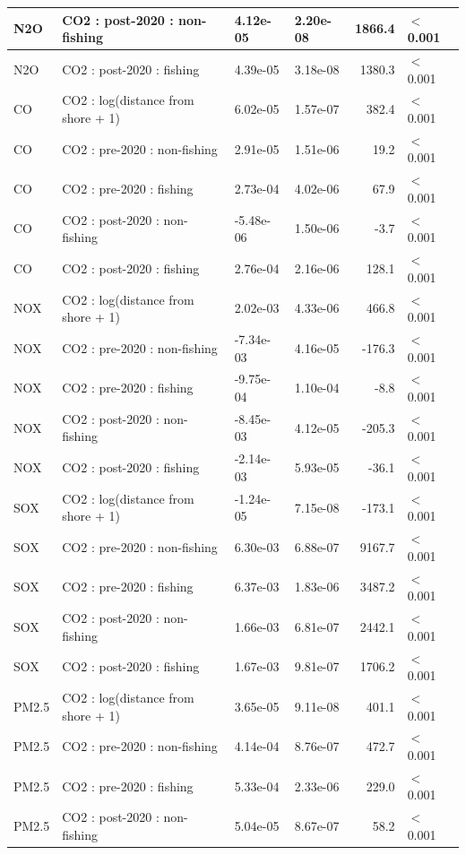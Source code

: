 \documentclass[lineno,pdflatex,sn-nature]{sn-jnl}
\begin{document}
\begin{table}[!h]
\begin{tabular}[t]{l|l|l|l|r|l}
\hline
N2O & CO2 : post-2020 : non-fishing & 4.12e-05 & 2.20e-08 & 1866.4 & $<$0.001\\
\hline
N2O & CO2 : post-2020 : fishing & 4.39e-05 & 3.18e-08 & 1380.3 & $<$0.001\\
\hline
CO & CO2 : log(distance from shore + 1) & 6.02e-05 & 1.57e-07 & 382.4 & $<$0.001\\
\hline
CO & CO2 : pre-2020 : non-fishing & 2.91e-05 & 1.51e-06 & 19.2 & $<$0.001\\
\hline
CO & CO2 : pre-2020 : fishing & 2.73e-04 & 4.02e-06 & 67.9 & $<$0.001\\
\hline
CO & CO2 : post-2020 : non-fishing & -5.48e-06 & 1.50e-06 & -3.7 & $<$0.001\\
\hline
CO & CO2 : post-2020 : fishing & 2.76e-04 & 2.16e-06 & 128.1 & $<$0.001\\
\hline
NOX & CO2 : log(distance from shore + 1) & 2.02e-03 & 4.33e-06 & 466.8 & $<$0.001\\
\hline
NOX & CO2 : pre-2020 : non-fishing & -7.34e-03 & 4.16e-05 & -176.3 & $<$0.001\\
\hline
NOX & CO2 : pre-2020 : fishing & -9.75e-04 & 1.10e-04 & -8.8 & $<$0.001\\
\hline
NOX & CO2 : post-2020 : non-fishing & -8.45e-03 & 4.12e-05 & -205.3 & $<$0.001\\
\hline
NOX & CO2 : post-2020 : fishing & -2.14e-03 & 5.93e-05 & -36.1 & $<$0.001\\
\hline
SOX & CO2 : log(distance from shore + 1) & -1.24e-05 & 7.15e-08 & -173.1 & $<$0.001\\
\hline
SOX & CO2 : pre-2020 : non-fishing & 6.30e-03 & 6.88e-07 & 9167.7 & $<$0.001\\
\hline
SOX & CO2 : pre-2020 : fishing & 6.37e-03 & 1.83e-06 & 3487.2 & $<$0.001\\
\hline
SOX & CO2 : post-2020 : non-fishing & 1.66e-03 & 6.81e-07 & 2442.1 & $<$0.001\\
\hline
SOX & CO2 : post-2020 : fishing & 1.67e-03 & 9.81e-07 & 1706.2 & $<$0.001\\
\hline
PM2.5 & CO2 : log(distance from shore + 1) & 3.65e-05 & 9.11e-08 & 401.1 & $<$0.001\\
\hline
PM2.5 & CO2 : pre-2020 : non-fishing & 4.14e-04 & 8.76e-07 & 472.7 & $<$0.001\\
\hline
PM2.5 & CO2 : pre-2020 : fishing & 5.33e-04 & 2.33e-06 & 229.0 & $<$0.001\\
\hline
PM2.5 & CO2 : post-2020 : non-fishing & 5.04e-05 & 8.67e-07 & 58.2 & $<$0.001\\

\end{tabular}
\end{table}
\end{document}
